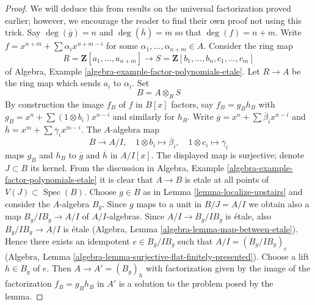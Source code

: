 \documentclass[10pt,a4paper]{amsart}
\theoremstyle{plain}
\theoremstyle{definition}
\theoremstyle{remark}
\numberwithin{equation}{subsection}
\def\Spec{\mathop{\mathrm{Spec}}}
\begin{document}
\begin{proof}
We will deduce this from results on the universal factorization proved
earlier; however, we encourage the reader to find their own proof not
using this trick. Say $\deg(\overline{g}) = n$ and $\deg(\overline{h}) = m$ so
that $\deg(f) = n + m$. Write $f = x^{n + m} + \sum \alpha_i x^{n + m - i}$
for some $\alpha_1, \ldots, \alpha_{n + m} \in A$. Consider the ring map
$$
R = \mathbf{Z}[a_1, \ldots, a_{n + m}]
\longrightarrow
S = \mathbf{Z}[b_1, \ldots, b_n, c_1, \ldots, c_m]
$$
of Algebra, Example \ref{algebra-example-factor-polynomials-etale}.
Let $R \to A$ be the ring map which sends $a_i$ to $\alpha_i$.
Set
$$
B = A \otimes_R S
$$
By construction the image $f_B$ of $f$ in $B[x]$ factors, say
$f_B = g_B h_B$ with $g_B = x^n + \sum (1 \otimes b_i) x^{n - i}$
and similarly for $h_B$.
Write $\overline{g} = x^n + \sum \overline{\beta}_i x^{n - i}$ and
$\overline{h} = x^m + \sum \overline{\gamma}_i x^{m - i}$.
The $A$-algebra map
$$
B \longrightarrow A/I, \quad
1 \otimes b_i \mapsto \overline{\beta}_i, \quad
1 \otimes c_i \mapsto \overline{\gamma}_i
$$
maps $g_B$ and $h_B$ to $\overline{g}$ and $\overline{h}$ in $A/I[x]$.
The displayed map is surjective; denote $J \subset B$ its kernel.
From the discussion in 
Algebra, Example \ref{algebra-example-factor-polynomials-etale}
it is clear that $A \to B$ is etale at all points of $V(J) \subset \Spec(B)$.
Choose $g \in B$ as in Lemma \ref{lemma-localize-upstairs} and
consider the $A$-algebra $B_g$. Since $g$ maps to a unit
in $B/J = A/I$ we obtain also a map $B_g/I B_g \to A/I$ of $A/I$-algebras.
Since $A/I \to B_g/I B_g$ is \'etale, also $B_g/IB_g \to A/I$ is \'etale
(Algebra, Lemma \ref{algebra-lemma-map-between-etale}). Hence there exists an
idempotent $e \in B_g/I B_g$ such that $A/I = (B_g/I B_g)_e$
(Algebra, Lemma \ref{algebra-lemma-surjective-flat-finitely-presented}).
Choose a lift $h \in B_g$ of $e$. Then $A \to A' = (B_g)_h$ with
factorization given by the image of the factorization $f_B = g_B h_B$
in $A'$ is a solution to the problem posed by the lemma.
\end{proof}
\end{document}
